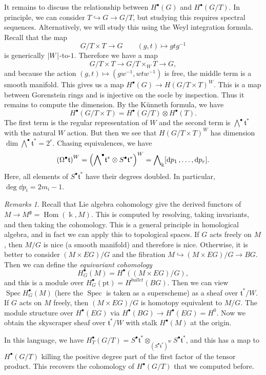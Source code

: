 \documentclass[leqno, openany]{memoir}
\theoremstyle{definition}
\theoremstyle{remark}
\newtheorem{rmks}[thm]{Remarks}
\theoremstyle{plain}
\theoremstyle{definition}
\theoremstyle{remark}
\renewcommand{\k}{\Bbbk}
\newcommand{\mf}[1]{\mathfrak{#1}}
\newcommand{\mr}[1]{\mathrm{#1}}
\DeclareMathOperator{\Hom}{Hom}
\DeclareMathOperator{\Spec}{Spec}
\begin{document}
It remains to discuss the relationship between $H^{\bullet}(G)$ and $H^{\bullet}(G/T)$. In principle, we can consider $T \hookrightarrow G \to G/T$, but studying this requires spectral sequences. Alternatively, we will study this using the Weyl integration formula. Recall that the map 
\[ G/T \times T \to G \qquad (g,t) \mapsto gtg^{-1} \]
is generically $\abs{W}$-to-$1$. Therefore we have a map
\[ G/T \times T \to G/T \times_W T \to G, \]
and because the action $(g,t) \mapsto (gw^{-1}, wtw^{-1})$ is free, the middle term is a smooth manifold. This gives us a map $H^{\bullet}(G) \to {H(G/T \times T)}^W$. This is a map between Gorenstein rings and is injective on the socle by inspection. Thus it remains to compute the dimension. By the K\"unneth formula, we have
\[ H^{\bullet}(G/T \times T) = H^{\bullet}(G/T) \otimes H^{\bullet}(T). \]
The first term is the regular representation of $W$ and the second term is $\bigwedge^{\bullet} \mf{t}^*$ with the natural $W$ action. But then we see that ${ H(G/T \times T) }^W$ has dimension $\dim \bigwedge^{\bullet} \mf{t}^* = 2^r$. Chasing equivalences, we have
\[ {(\Omega^{\bullet} \mf{t})}^W = {\qty({\bigwedge}^{\bullet} \mf{t}^* \otimes S^{\bullet} \mf{t}^*)}^W = {\bigwedge}_{\k} [\dd{p_1}, \ldots, \dd{p_r}]. \]
Here, all elements of $S^{\bullet} \mf{t}^*$ have their degrees doubled. In particular, $\deg \dd{p_i} = 2 m_i - 1$.

\begin{rmks}
    Recall that Lie algebra cohomology give the derived functors of $M \to M^{\mf{g}} = \Hom(\k, M)$. This is computed by resolving, taking invariants, and then taking the cohomology. This is a general principle in homological algebra, and in fact we can apply this to topological spaces. If $G$ acts freely on $M$, then $M/G$ is nice (a smooth manifold) and therefore is nice. Otherwise, it is better to consider $(M \times EG)/G$ and the fibration $M \hookrightarrow (M \times EG)/G \to BG$. Then we can define the \textit{equivariant cohomology}
    \[ H^{\bullet}_G(M) = H^{\bullet}((M \times EG)/G), \]
    and this is a module over $H_G^{\bullet}(\mr{pt}) = H^{bullet}(BG)$. Then we can view $\Spec H_G^{\bullet}(M)$ (here the $\Spec$ is taken as a superscheme) as a sheaf over $\mf{t}^*/W$. If $G$ acts on $M$ freely, then $(M \times EG)/G$ is homotopy equivalent to $M/G$. The module structure over $H^{\bullet}(EG)$ via $H^{\bullet}(BG) \to H^{\bullet}(EG) = H^0$. Now we obtain the skyscraper sheaf over $\mf{t}^*/W$ with stalk $H^{\bullet}(M)$ at the origin.

    In this language, we have $H_T^{\bullet}(G/T) = S^{\bullet} \mf{t}^* \otimes_{{(S^{\bullet} \mf{t}^*)}^W} S^{\bullet} \mf{t}^*$, and this has a map to $H^{\bullet}(G/T)$ killing the positive degree part of the first factor of the tensor product. This recovers the cohomology of $H^{\bullet}(G/T)$ that we computed before.
\end{rmks}
\end{document}
